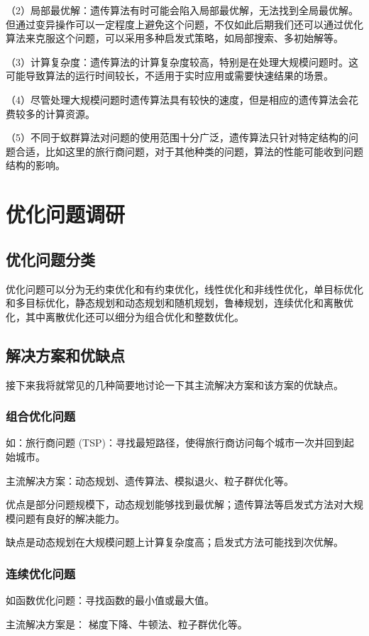 \documentclass{cjc}
\begin{document}
（2）局部最优解：遗传算法有时可能会陷入局部最优解，无法找到全局最优解。但通过变异操作可以一定程度上避免这个问题，不仅如此后期我们还可以通过优化算法来克服这个问题，可以采用多种启发式策略，如局部搜索、多初始解等。

（3）计算复杂度：遗传算法的计算复杂度较高，特别是在处理大规模问题时。这可能导致算法的运行时间较长，不适用于实时应用或需要快速结果的场景。

（4）尽管处理大规模问题时遗传算法具有较快的速度，但是相应的遗传算法会花费较多的计算资源。

（5）不同于蚁群算法对问题的使用范围十分广泛，遗传算法只针对特定结构的问题合适，比如这里的旅行商问题，对于其他种类的问题，算法的性能可能收到问题结构的影响。

\section{优化问题调研}
\subsection{优化问题分类}
优化问题可以分为无约束优化和有约束优化，线性优化和非线性优化，单目标优化和多目标优化，静态规划和动态规划和随机规划，鲁棒规划，连续优化和离散优化，其中离散优化还可以细分为组合优化和整数优化。

\subsection{解决方案和优缺点}
接下来我将就常见的几种简要地讨论一下其主流解决方案和该方案的优缺点。

\subsubsection{组合优化问题}
如：旅行商问题 (TSP)：寻找最短路径，使得旅行商访问每个城市一次并回到起始城市。

主流解决方案：动态规划、遗传算法、模拟退火、粒子群优化等。

优点是部分问题规模下，动态规划能够找到最优解；遗传算法等启发式方法对大规模问题有良好的解决能力。

缺点是动态规划在大规模问题上计算复杂度高；启发式方法可能找到次优解。

\subsubsection{连续优化问题}
如函数优化问题：寻找函数的最小值或最大值。

主流解决方案是： 梯度下降、牛顿法、粒子群优化等。
\end{document}
